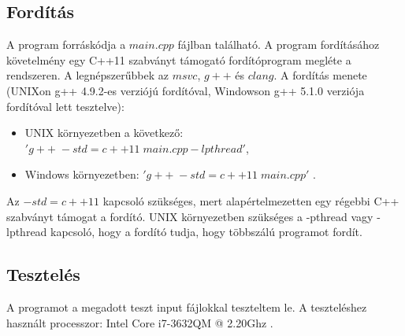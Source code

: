 \documentclass{article}
\begin{document}
\subsection{Fordítás}
A program forráskódja a $main.cpp$ fájlban található.
A program fordításához követelmény egy C++11 szabványt támogató fordítóprogram megléte a rendszeren. A legnépszerűbbek az $msvc$, $g++$ és $clang$.
A fordítás menete (UNIXon g++ 4.9.2-es verziójú fordítóval, Windowson g++ 5.1.0 verziója fordítóval lett tesztelve):
\begin{itemize}
	\item UNIX környezetben a következő: $'g++ \; -std=c++11 \; main.cpp -lpthread'$,
	\item Windows környezetben: $'g++ \; -std=c++11 \; main.cpp'$ .
\end{itemize}
Az $-std=c++11$ kapcsoló szükséges, mert alapértelmezetten egy régebbi C++ szabványt támogat a fordító. UNIX környezetben szükséges a -pthread vagy -lpthread kapcsoló, hogy a fordító tudja, hogy többszálú programot fordít.

\subsection{Tesztelés}
A programot a megadott teszt input fájlokkal teszteltem le. A teszteléshez használt processzor: Intel Core i7-3632QM @ 2.20Ghz .\\
\end{document}
